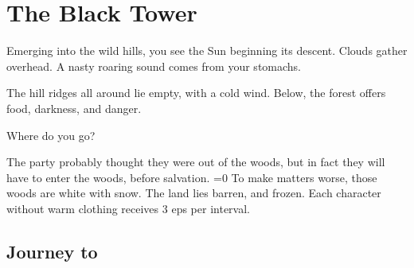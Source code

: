 \chapter{The Black Tower}
\epigraph{
  Emerging into the wild hills, you see the Sun beginning its descent.
  Clouds gather overhead.
  A nasty roaring sound comes from your stomachs.

  The hill ridges all around lie empty, with a cold wind.
  Below, the forest offers food, darkness, and danger.

  Where do you go?
}{}

\noindent
The party probably thought they were out of the woods, but in fact they will have to enter the woods, before salvation.
\ifnum\value{temperature}=0
  To make matters worse, those woods are white with snow.
  The land lies barren, and frozen.
  Each character without warm clothing receives 3 \glspl{ep} per \gls{interval}.
\fi

\section{Journey to }

